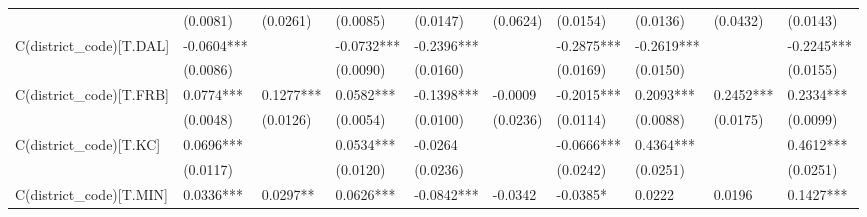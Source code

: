 \begin{table}
\begin{center}
\begin{tabular}{llllllllll}
                         & (0.0081)               & (0.0261)                & (0.0085)                 & (0.0147)                    & (0.0624)                     & (0.0154)                      & (0.0136)                   & (0.0432)                    & (0.0143)                      \\
C(district\_code)[T.DAL] & -0.0604***             &                         & -0.0732***               & -0.2396***                  &                              & -0.2875***                    & -0.2619***                 &                             & -0.2245***                    \\
                         & (0.0086)               &                         & (0.0090)                 & (0.0160)                    &                              & (0.0169)                      & (0.0150)                   &                             & (0.0155)                      \\
C(district\_code)[T.FRB] & 0.0774***              & 0.1277***               & 0.0582***                & -0.1398***                  & -0.0009                      & -0.2015***                    & 0.2093***                  & 0.2452***                   & 0.2334***                     \\
                         & (0.0048)               & (0.0126)                & (0.0054)                 & (0.0100)                    & (0.0236)                     & (0.0114)                      & (0.0088)                   & (0.0175)                    & (0.0099)                      \\
C(district\_code)[T.KC]  & 0.0696***              &                         & 0.0534***                & -0.0264                     &                              & -0.0666***                    & 0.4364***                  &                             & 0.4612***                     \\
                         & (0.0117)               &                         & (0.0120)                 & (0.0236)                    &                              & (0.0242)                      & (0.0251)                   &                             & (0.0251)                      \\
C(district\_code)[T.MIN] & 0.0336***              & 0.0297**                & 0.0626***                & -0.0842***                  & -0.0342                      & -0.0385*                      & 0.0222                     & 0.0196                      & 0.1427***                     \\

\end{tabular}
\end{center}
\end{table}
